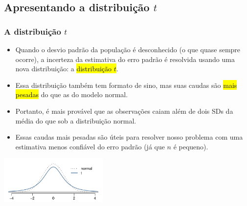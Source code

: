 
\subsection{Apresentando a distribuição $ t $}


\begin{frame}
\frametitle{A distribuição $ t $}

\begin{itemize}
\justifying
\item Quando o desvio padrão da população é desconhecido (o que quase sempre ocorre), a incerteza da estimativa do erro padrão é resolvida usando uma nova distribuição: a \hl{distribuição $ t $}.

\pause
\justifying
\item Essa distribuição também tem formato de sino, mas suas caudas são \hl{mais pesadas} do que as do modelo normal.

\pause
\justifying
\item Portanto, é mais provável que as observações caiam além de dois SDs da média do que sob a distribuição normal.

\pause
\justifying
\item Essas caudas mais pesadas são úteis para resolver nosso problema com uma estimativa menos confiável do erro padrão (já que $n$ é pequeno).

\end{itemize}

\begin{center}
\includegraphics[width=0.4\textwidth]{5-1_one_t/tDistCompareToNormalDist.pdf}
\end{center}

\end{frame}


